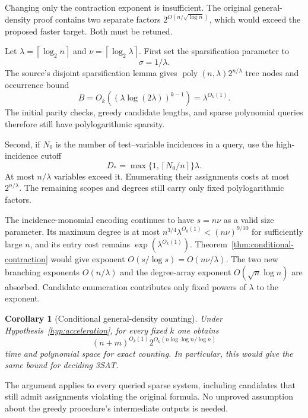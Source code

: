 \documentclass[11pt,letterpaper]{article}
\numberwithin{equation}{section}
\newtheorem{corollary}[theorem]{Corollary}
\theoremstyle{definition}
\theoremstyle{remark}
\newcommand{\poly}{\operatorname{poly}}
\newcommand{\ceil}[1]{\left\lceil #1\right\rceil}
\begin{document}
Changing only the contraction exponent is insufficient. The original
general-density proof contains two separate factors
$2^{O(n/\sqrt{\log n})}$, which would exceed the proposed faster target.
Both must be retuned.

Let $\lambda=\ceil{\log_2n}$ and $\nu=\ceil{\log_2\lambda}$. First set
the sparsification parameter to
\begin{equation}
 \sigma=1/\lambda.\label{eq:sigma}
\end{equation}
The source's disjoint sparsification lemma gives
$\poly(n,\lambda)2^{n/\lambda}$ tree nodes and occurrence bound
\[
 B=O_k((\lambda\log(2\lambda))^{k-1})=\lambda^{O_k(1)}.
\]
The initial parity checks, greedy candidate lengths, and sparse polynomial
queries therefore still have polylogarithmic sparsity.

Second, if $N_0$ is the number of test--variable incidences in a query,
use the high-incidence cutoff
\begin{equation}
 D_* =\max\{1,\ceil{N_0/n}\}\lambda.\label{eq:high-cutoff}
\end{equation}
At most $n/\lambda$ variables exceed it. Enumerating their assignments
costs at most $2^{n/\lambda}$. The remaining scopes and degrees still
carry only fixed polylogarithmic factors.

The incidence-monomial encoding continues to have $s=n\nu$ as a valid
size parameter. Its maximum degree is at most
$n^{3/4}\lambda^{O_k(1)}<(n\nu)^{9/10}$ for sufficiently large $n$,
and its entry cost remains $\exp(\lambda^{O_k(1)})$.
Theorem~\ref{thm:conditional-contraction} would give exponent
$O(s/\log s)=O(n\nu/\lambda)$. The two new branching exponents
$O(n/\lambda)$ and the degree-array exponent $O(\sqrt n\log n)$ are
absorbed. Candidate enumeration contributes only fixed powers of
$\lambda$ to the exponent.

\begin{corollary}[Conditional general-density counting]
\label{cor:conditional-general}
Under Hypothesis~\ref{hyp:acceleration}, for every fixed $k$ one obtains
\begin{equation}
 \boxed{(n+m)^{O_k(1)}
       2^{O_k(n\log\log n/\log n)}}\label{eq:conditional-target}
\end{equation}
time and polynomial space for exact counting. In particular, this would
give the same bound for deciding 3SAT.
\end{corollary}

The argument applies to every queried sparse system, including candidates
that still admit assignments violating the original formula. No unproved
assumption about the greedy procedure's intermediate outputs is needed.
\end{document}
